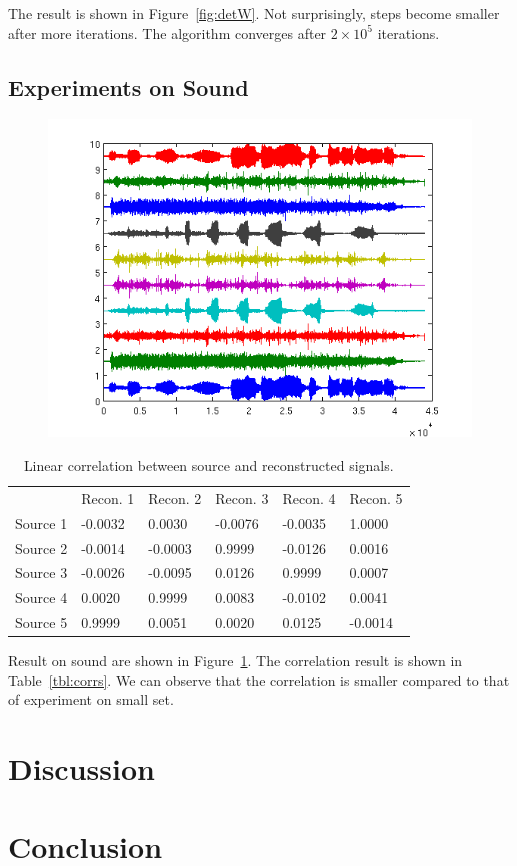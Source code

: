 \documentclass[10pt]{article}
\begin{document}
The result is shown in Figure~\ref{fig:detW}. Not surprisingly, steps
become smaller after more iterations. The algorithm converges after $2
\times 10^5$ iterations.

\subsection{Experiments on Sound}

\begin{figure}
\centering
\includegraphics[width=.8\textwidth]{soundfull.png}
\caption{}
\label{fig:sound}
\end{figure}

\begin{table}
\centering
\begin{tabular}{ | l l l l l l | }
\hline
& Recon. 1& Recon. 2& Recon. 3& Recon. 4& Recon. 5\\
Source 1 &-0.0032& 0.0030&-0.0076&-0.0035& 1.0000\\
Source 2 &-0.0014&-0.0003& 0.9999&-0.0126& 0.0016\\
Source 3 &-0.0026&-0.0095& 0.0126& 0.9999& 0.0007\\
Source 4 &0.0020& 0.9999& 0.0083&-0.0102& 0.0041\\
Source 5 &0.9999& 0.0051& 0.0020& 0.0125&-0.0014\\
\hline
\end{tabular}
\caption{Linear correlation between source and reconstructed signals.}
\label{tbl:corrsf}
\end{table}

Result on sound are shown in Figure~\ref{fig:sound}. The correlation result
is shown in Table~\ref{tbl:corrs}. We can observe that the correlation is
smaller compared to that of experiment on small set.

\section{Discussion}

\section{Conclusion}
\end{document}
